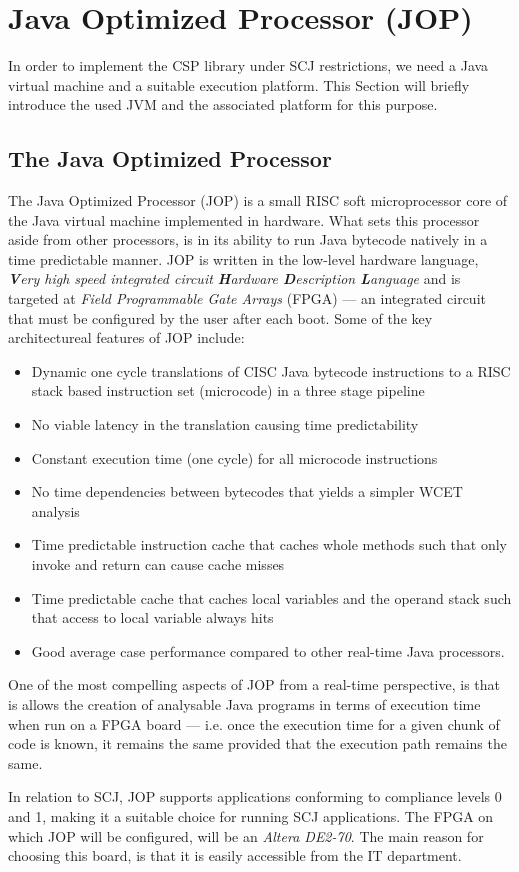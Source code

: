 \chapter{Java Optimized Processor (JOP)}
\label{chapter:jop}
In order to implement the CSP library under SCJ restrictions, we need a Java virtual machine and a suitable execution platform. This Section will briefly introduce the used JVM and the associated platform for this purpose. 

\section{The Java Optimized Processor}
The Java Optimized Processor (JOP) is a small RISC soft microprocessor core of the Java virtual machine implemented in hardware. What sets this processor aside from other processors, is in its ability to run Java bytecode natively in a time predictable manner. JOP is written in the low-level hardware language, \textit{\textbf{V}ery high speed integrated circuit \textbf{H}ardware \textbf{D}escription \textbf{L}anguage} and is targeted at \textit{Field Programmable Gate Arrays} (FPGA) --- an integrated circuit that must be configured by the user after each boot. Some of the key architectureal features of JOP include:

\begin{itemize}
 	\item Dynamic one cycle translations of CISC Java bytecode instructions to a RISC stack based instruction set (microcode) in a three stage pipeline
 	\item No viable latency in the translation causing time predictability
 	\item Constant execution time (one cycle) for all microcode instructions
 	\item No time dependencies between bytecodes that yields a simpler WCET analysis
 	\item Time predictable instruction cache that caches whole methods such that only invoke and return can cause cache misses
 	\item Time predictable cache that caches local variables and the operand stack such that access to local variable always hits
 	\item Good average case performance compared to other real-time Java processors.
\end{itemize}

One of the most compelling aspects of JOP from a real-time perspective, is that is allows the creation of analysable Java programs in terms of execution time when run on a FPGA board --- i.e. once the execution time for a given chunk of code is known, it remains the same provided that the execution path remains the same.

In relation to SCJ, JOP supports applications conforming to compliance levels 0 and 1, making it a suitable choice for running SCJ applications. The FPGA on which JOP will be configured, will be an \textit{Altera DE2-70}. The main reason for choosing this board, is that it is easily accessible from the IT department.\label{chapter:jop}

\cite{JOPDesign} \cite{Schoeberl_ajava} \cite{jop:handbook}